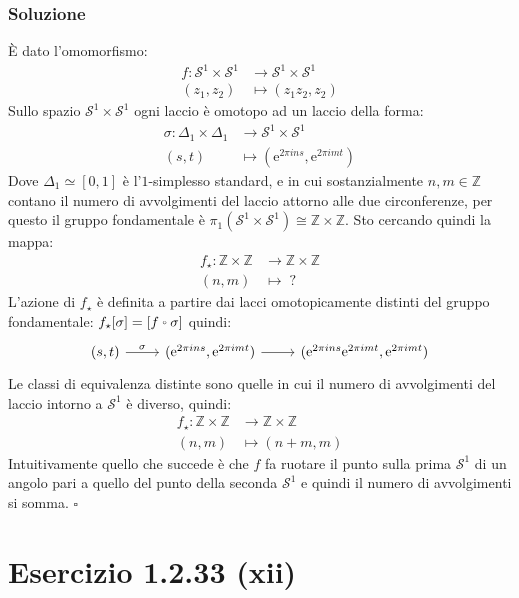 \documentclass[10pt, toc=sectionentrywithdots]{scrartcl}
\newcommand{\Z}{\mathbb{Z}}
\newcommand{\Sph}[1][]{\mathcal{S}^#1}
\let\latexcirc=\circ
\newcommand{\ccirc}{\mathbin{\mathchoice
  {\xcirc\scriptstyle}
  {\xcirc\scriptstyle}
  {\xcirc\scriptscriptstyle}
  {\xcirc\scriptscriptstyle}
}}
\newcommand{\xcirc}[1]{\vcenter{\hbox{$#1\latexcirc$}}}
\let\circ\ccirc
\begin{document}
\subsubsection*{Soluzione}

È dato l'omomorfismo:
\begin{align*}
  f \colon \Sph{1} \times \Sph{1} & \to  \Sph{1} \times \Sph{1} \\
  (z_1, z_2) & \mapsto (z_1 z_2, z_2)
\end{align*}
Sullo spazio $ \Sph{1} \times \Sph{1} $ ogni laccio è
omotopo ad un laccio della forma:
\begin{align*}
  \sigma \colon \Delta_1 \times \Delta_1 & \to \Sph{1} \times \Sph{1} \\
  (s,t) & \mapsto (\mathrm{e}^{2 \pi i n s}, \mathrm{e}^{2 \pi i m t})
\end{align*}
Dove $ \Delta_1 \simeq [0,1] $ è l'$ 1 $-simplesso standard, e in
cui sostanzialmente $ n, m \in \Z $ contano il numero
di avvolgimenti del laccio attorno alle due circonferenze,
per questo il gruppo fondamentale è $ \pi_1(\Sph{1} \times \Sph{1})
\cong \Z \times \Z $. Sto cercando quindi la mappa:
\begin{align*}
  f_\star \colon \Z \times \Z & \to \Z \times \Z \\
  (n, m) & \mapsto \; ?
\end{align*}
L'azione di $ f_\star $ è definita a partire dai lacci
omotopicamente distinti del gruppo fondamentale:
$ f_\star[\sigma] = [f \circ \sigma] $ quindi:
\[
  \begin{tikzcd}
    (s,t) \rar{\sigma} &  (\mathrm{e}^{2 \pi i n s}, \mathrm{e}^{2 \pi i m t}) \rar &
     (\mathrm{e}^{2 \pi i n s} \mathrm{e}^{2 \pi i m t}, \mathrm{e}^{2 \pi i m t})
  \end{tikzcd}
\]
Le classi di equivalenza distinte sono quelle in cui il numero
di avvolgimenti del laccio intorno a $ \Sph{1} $ è diverso,
quindi:
\begin{align*}
  f_\star \colon \Z \times \Z & \to \Z \times \Z \\
  (n, m) & \mapsto (n+m, m)
\end{align*}
Intuitivamente quello che succede è che $ f $ fa ruotare il punto
sulla prima $ \Sph{1} $ di un angolo pari a quello del punto della seconda
$ \Sph{1} $ e quindi il numero di avvolgimenti si somma.
\hfill $ \square $

\section[1.2.33 (xii)]{Esercizio 1.2.33 (xii)}
\end{document}
